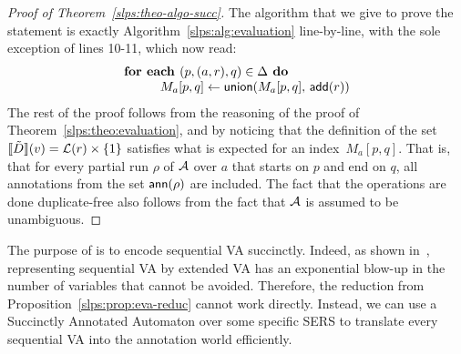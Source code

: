 	\begin{proof}[Proof of Theorem~\ref{slps:theo-algo-succ}]
	The algorithm that we give to prove the statement is exactly Algorithm~\ref{slps:alg:evaluation} line-by-line, with the sole exception of lines 10-11, which now read: 
	$$
	\begin{array}{l}
		\textbf{for each }(p,(a,r), q) \in \Delta \textbf{ do } \\
		\hspace{1cm} M_a[p,q] \gets \mathsf{union}(M_a[p,q],\, \mathsf{add}(r))
	\end{array}
	$$ 
	The rest of the proof follows from the reasoning of the proof of Theorem~\ref{slps:theo:evaluation}, and by noticing that the definition of the set ${\llbracket{\tilde{D}}\rrbracket}(v) = \mathcal{L}(r) \times \{1\}$ satisfies what is expected for an index~$M_a[p,q]$. That is, that for every partial run $\rho$ of $\mathcal{A}$ over $a$ that starts on $p$ and end on $q$, all annotations from the set $\textsf{ann}(\rho)$ are included. The fact that the operations are done duplicate-free also follows from the fact that $\mathcal{A}$ is assumed to be unambiguous.
\end{proof}

The purpose of \crt is to encode sequential VA succinctly. Indeed, as shown in~\cite{FlorenzanoRUVV20}, representing sequential VA by extended VA has an exponential blow-up in the number of variables that cannot be avoided. Therefore, the reduction from Proposition~\ref{slps:prop:eva-reduc} cannot work directly. Instead, we can use a Succinctly Annotated Automaton over some specific SERS to translate every sequential VA into the annotation world efficiently. 

